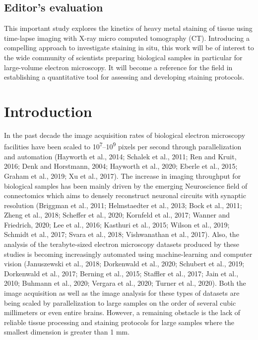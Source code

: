 \documentclass{article}
\begin{document}
\subsection*{Editor's evaluation}
This important study explores the kinetics of heavy metal staining of tissue using time-lapse imaging with X-ray micro computed tomography (CT). Introducing a compelling approach to investigate staining in situ, this work will be of interest to the wide community of scientists preparing biological samples in particular for large-volume electron microscopy. It will become a reference for the field in establishing a quantitative tool for assessing and developing staining protocols.

\section*{Introduction}
In the past decade the image acquisition rates of biological electron microscopy facilities have been scaled to 10\textsuperscript{7}–10\textsuperscript{9} pixels per second through parallelization and automation (Hayworth et al., 2014; Schalek et al., 2011; Ren and Kruit, 2016; Denk and Horstmann, 2004; Hayworth et al., 2020; Eberle et al., 2015; Graham et al., 2019; Xu et al., 2017). The increase in imaging throughput for biological samples has been mainly driven by the emerging Neuroscience field of connectomics which aims to densely reconstruct neuronal circuits with synaptic resolution (Briggman et al., 2011; Helmstaedter et al., 2013; Bock et al., 2011; Zheng et al., 2018; Scheffer et al., 2020; Kornfeld et al., 2017; Wanner and Friedrich, 2020; Lee et al., 2016; Kasthuri et al., 2015; Wilson et al., 2019; Schmidt et al., 2017; Svara et al., 2018; Vishwanathan et al., 2017). Also, the analysis of the terabyte-sized electron microscopy datasets produced by these studies is becoming increasingly automated using machine-learning and computer vision (Januszewski et al., 2018; Dorkenwald et al., 2020; Schubert et al., 2019; Dorkenwald et al., 2017; Berning et al., 2015; Staffler et al., 2017; Jain et al., 2010; Buhmann et al., 2020; Vergara et al., 2020; Turner et al., 2020). Both the image acquisition as well as the image analysis for these types of datasets are being scaled by parallelization to large samples on the order of several cubic millimeters or even entire brains. However, a remaining obstacle is the lack of reliable tissue processing and staining protocols for large samples where the smallest dimension is greater than 1 mm.
\end{document}
